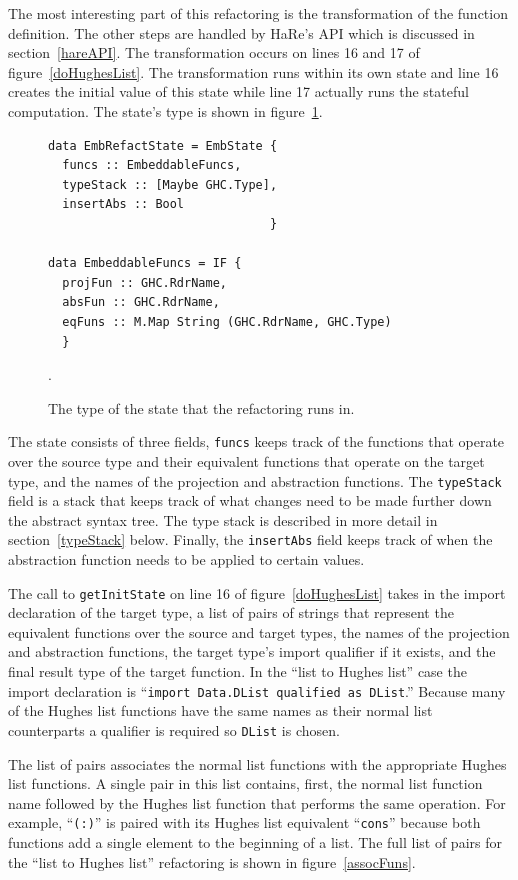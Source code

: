 The most interesting part of this refactoring is the transformation of the function definition. The other steps are handled by HaRe's API which is discussed in section~\ref{hareAPI}. The transformation occurs on lines 16 and 17 of figure~\ref{doHughesList}. The transformation runs within its own state and line 16 creates the initial value of this state while line 17 actually runs the stateful computation. The state's type is shown in figure~\ref{embState}.

\begin{figure}[t]
\begin{lstlisting}
data EmbRefactState = EmbState {
  funcs :: EmbeddableFuncs,
  typeStack :: [Maybe GHC.Type],
  insertAbs :: Bool
                               }
                               
data EmbeddableFuncs = IF {
  projFun :: GHC.RdrName,
  absFun :: GHC.RdrName,
  eqFuns :: M.Map String (GHC.RdrName, GHC.Type)
  }
\end{lstlisting}
\caption{The type of the state that the refactoring runs in.}
\label{embState}.
\end{figure}

The state consists of three fields, \texttt{funcs} keeps track of the functions that operate over the source type and their equivalent functions that operate on the target type, and the names of the projection and abstraction functions. The \texttt{typeStack} field is a stack that keeps track of what changes need to be made further down the abstract syntax tree. The type stack is described in more detail in section~\ref{typeStack} below. Finally, the \texttt{insertAbs} field keeps track of when the abstraction function needs to be applied to certain values.

The call to \texttt{getInitState} on line 16 of figure~\ref{doHughesList} takes in the import declaration of the target type, a list of pairs of strings that represent the equivalent functions over the source and target types, the names of the projection and abstraction functions, the target type's import qualifier if it exists, and the final result type of the target function. In the ``list to Hughes list'' case the import declaration is ``\texttt{import Data.DList qualified as DList}.'' Because many of the Hughes list functions have the same names as their normal list counterparts a qualifier is required so \texttt{DList} is chosen. 

The list of pairs associates the normal list functions with the appropriate Hughes list functions. A single pair in this list contains, first, the normal list function name followed by the Hughes list function that performs the same operation. For example, ``\texttt{(:)}'' is paired with its Hughes list equivalent ``\texttt{cons}'' because both functions add a single element to the beginning of a list. The full list of pairs for the ``list to Hughes list'' refactoring is shown in figure~\ref{assocFuns}.


